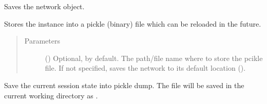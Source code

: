 \documentclass[letterpaper,10pt,english]{sphinxmanual}
\begin{document}
\begin{fulllineitems}

\begin{fulllineitems}
\label{\detokenize{main:pypath.main.PyPath.remove_undirected}}
\end{fulllineitems}


\begin{fulllineitems}
\label{\detokenize{main:pypath.main.PyPath.run_batch}}
\end{fulllineitems}


\begin{fulllineitems}
\label{\detokenize{main:pypath.main.PyPath.save_network}}
Saves the network object.

Stores the instance into a pickle (binary) file which can be
reloaded in the future.
\begin{quote}\begin{description}
\item[{Parameters}] \leavevmode
{} () \textendash{} Optional,  by default. The path/file name where to
store the pcikle file. If not specified, saves the network
to its default location
().

\end{description}\end{quote}

\end{fulllineitems}


\begin{fulllineitems}
\label{\detokenize{main:pypath.main.PyPath.save_session}}
Save the current session state into pickle dump. The file will
be saved in the current working directory as
.


\end{fulllineitems}
\end{fulllineitems}
\end{document}
